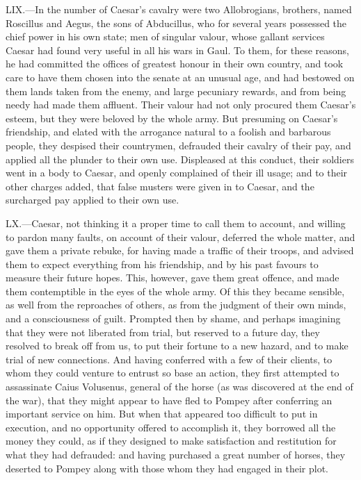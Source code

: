 LIX.—In the number of Caesar's cavalry were two Allobrogians, brothers,
named Roscillus and Aegus, the sons of Abducillus, who for several years
possessed the chief power in his own state; men of singular valour,
whose gallant services Caesar had found very useful in all his wars in
Gaul. To them, for these reasons, he had committed the offices of
greatest honour in their own country, and took care to have them chosen
into the senate at an unusual age, and had bestowed on them lands taken
from the enemy, and large pecuniary rewards, and from being needy had
made them affluent. Their valour had not only procured them Caesar's
esteem, but they were beloved by the whole army. But presuming on
Caesar's friendship, and elated with the arrogance natural to a foolish
and barbarous people, they despised their countrymen, defrauded their
cavalry of their pay, and applied all the plunder to their own use.
Displeased at this conduct, their soldiers went in a body to Caesar, and
openly complained of their ill usage; and to their other charges added,
that false musters were given in to Caesar, and the surcharged pay
applied to their own use.

LX.—Caesar, not thinking it a proper time to call them to account, and
willing to pardon many faults, on account of their valour, deferred the
whole matter, and gave them a private rebuke, for having made a traffic
of their troops, and advised them to expect everything from his
friendship, and by his past favours to measure their future hopes. This,
however, gave them great offence, and made them contemptible in the eyes
of the whole army. Of this they became sensible, as well from the
reproaches of others, as from the judgment of their own minds, and a
consciousness of guilt. Prompted then by shame, and perhaps imagining
that they were not liberated from trial, but reserved to a future day,
they resolved to break off from us, to put their fortune to a new
hazard, and to make trial of new connections. And having conferred with
a few of their clients, to whom they could venture to entrust so base an
action, they first attempted to assassinate Caius Volusenus, general of
the horse (as was discovered at the end of the war), that they might
appear to have fled to Pompey after conferring an important service on
him. But when that appeared too difficult to put in execution, and no
opportunity offered to accomplish it, they borrowed all the money they
could, as if they designed to make satisfaction and restitution for what
they had defrauded: and having purchased a great number of horses, they
deserted to Pompey along with those whom they had engaged in their plot.

